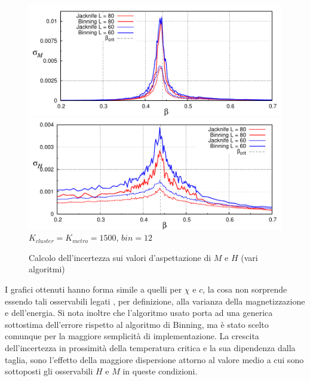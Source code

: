  \begin {figure}[h!]
    \begin{center}
	\caption[1) ParteA\_SigmaMvsBeta.cpp \quad $/\;$ 2) ParteA\_SigmaHvsBeta.cpp ]{Calcolo dell'incertezza sui valori d'aspettazione di $M$ e $H$ (\footnotesize vari algoritmi)}\label{fig: SigmaMvsBeta}
        \includegraphics[scale=1]{Immagini/ParteA/SigmaMvsBeta}
     \newline    
        \includegraphics[scale=1]{Immagini/ParteA/SigmaHvsBeta}
     \newline   
		\footnotesize $K_{cluster} = K_{metro} = 1500$, $bin = 12$  
    \end{center}
 \end {figure}
I grafici ottenuti hanno forma simile a quelli per $\chi$ e $c$, la cosa non sorprende essendo tali osservabili legati ,  per definizione, alla varianza della magnetizzazione e dell'energia. Si nota inoltre che l'algoritmo usato porta ad una generica sottostima dell'errore rispetto al algoritmo di Binning, ma è stato scelto comunque per la maggiore semplicità di implementazione.
\newline
La crescita dell'incertezza in prossimità della temperatura critica e la sua dipendenza dalla taglia, sono l'effetto della maggiore dispersione attorno al valore medio a cui sono sottoposti gli osservabili $H$ e $M$ in queste condizioni.
 
